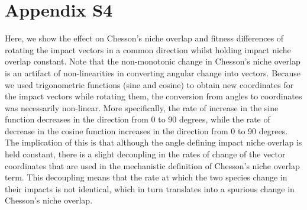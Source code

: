 \clearpage
\section{Appendix S4}
Here, we show the effect on Chesson's niche overlap and fitness differences of rotating the impact vectors in a common direction whilst holding impact niche overlap constant. Note that the non-monotonic change in Chesson's niche overlap is an artifact of non-linearities in converting angular change into vectors. Because we used trigonometric functions (sine and cosine) to obtain new coordinates for the impact vectors while rotating them, the conversion from angles to coordinates was necessarily non-linear. More specifically, the rate of increase in the sine function decreases in the direction from 0 to 90 degrees, while the rate of decrease in the cosine function increases in the direction from 0 to 90 degrees. The implication of this is that although the angle defining impact niche overlap is held constant, there is a slight decoupling in the rates of change of the vector coordinates that are used in the mechanistic definition of Chesson's niche overlap term. This decoupling means that the rate at which the two species change in their impacts is not identical, which in turn translates into a spurious change in Chesson's niche overlap.  
\par


